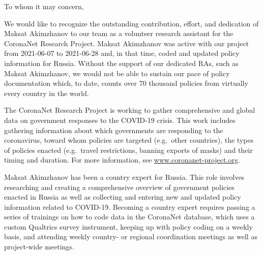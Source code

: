 \documentclass[
]{article}
\title{\vspace{-3cm}
\fontfamily{cmr}\fontsize{20}{100}\selectfont {\color{cngray} \textbf{Certificate of Appreciation}}}
\author{}
\date{\vspace{-2.5em}}
\begin{document}
\maketitle

\addtolength{\headheight}{2.0cm}
\pagestyle{fancyplain}
\fancyhf{}
\renewcommand{\headrulewidth}{0pt}

\fontsize{12}{4}\selectfont
\setlength{\baselineskip}{0.5cm}

\color{cntext}

To whom it may concern,

We would like to recognize the outstanding contribution, effort, and
dedication of Maksat Akimzhanov to our team as a volunteer research
assistant for the CoronaNet Research Project. Maksat Akimzhanov was
active with our project from 2021-06-07 to 2021-06-28 and, in that time,
coded and updated policy information for Russia. Without the support of
our dedicated RAs, such as Maksat Akimzhanov, we would not be able to
sustain our pace of policy documentation which, to date, counts over 70
thousand policies from virtually every country in the world.

The CoronaNet Research Project is working to gather comprehensive and
global data on government responses to the COVID-19 crisis. This work
includes gathering information about which governments are responding to
the coronavirus, toward whom policies are targeted (e.g.~other
countries), the types of policies enacted (e.g.~travel restrictions,
banning exports of masks) and their timing and duration. For more
information, see \url{www.coronanet-project.org}.

Maksat Akimzhanov has been a country expert for Russia. This role
involves researching and creating a comprehensive overview of government
policies enacted in Russia as well as collecting and entering new and
updated policy information related to COVID-19. Becoming a country
expert requires passing a series of trainings on how to code data in the
CoronaNet database, which uses a custom Qualtrics survey instrument,
keeping up with policy coding on a weekly basis, and attending weekly
country- or regional coordination meetings as well as project-wide
meetings.
\end{document}
